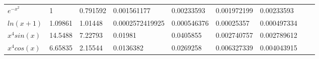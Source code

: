 {\begin{tabular}{lllllllll}
$e^{-x^2}$ & 1                       & 0.791592              & 0.001561177                     & 0.00233593                      & 0.001972199                         & 0.00233593                            \\
$ln(x+1)$                                      & 1.09861                 & 1.01448               & 0.0002572419925 & 0.000546376 & 0.00025357                          & 0.000497334                           \\
$x^4sin(x)$               & 14.5488                 & 7.22793               & 0.01981 & 0.0405855 & 0.002740757                         & 0.002789612                           \\
$x^4cos(x)$               & 6.65835                 & 2.15544               & 0.0136382 & 0.0269258 & 0.006327339                         & 0.004043915                          

\end{tabular}}

